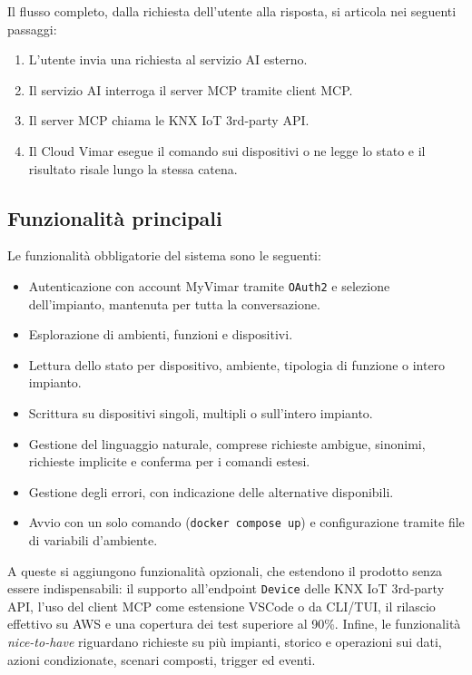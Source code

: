 \documentclass[11pt, a4paper]{article}
\begin{document}
\noindent Il flusso completo, dalla richiesta dell'utente alla risposta, si articola nei seguenti passaggi:
\begin{enumerate}
    \item L'utente invia una richiesta al servizio AI esterno.
    \item Il servizio AI interroga il server MCP tramite client MCP.
    \item Il server MCP chiama le KNX IoT 3rd-party API.
    \item Il Cloud Vimar esegue il comando sui dispositivi o ne legge lo stato e il risultato risale lungo la stessa catena.
\end{enumerate}

\subsection{Funzionalità principali}
Le funzionalità obbligatorie del sistema sono le seguenti:
\begin{itemize}
    \item Autenticazione con account MyVimar tramite \texttt{OAuth2} e selezione dell'impianto, mantenuta per tutta la conversazione.
    \item Esplorazione di ambienti, funzioni e dispositivi.
    \item Lettura dello stato per dispositivo, ambiente, tipologia di funzione o intero impianto.
    \item Scrittura su dispositivi singoli, multipli o sull'intero impianto.
    \item Gestione del linguaggio naturale, comprese richieste ambigue, sinonimi, richieste implicite e conferma per i comandi estesi.
    \item Gestione degli errori, con indicazione delle alternative disponibili.
    \item Avvio con un solo comando (\texttt{docker compose up}) e configurazione tramite file di variabili d'ambiente.
\end{itemize}

\noindent A queste si aggiungono funzionalità opzionali, che estendono il prodotto senza essere indispensabili: il supporto all'endpoint \texttt{Device} delle KNX IoT 3rd-party API, l'uso del client MCP come estensione VSCode o da CLI/TUI, il rilascio effettivo su AWS e una copertura dei test superiore al 90\%. Infine, le funzionalità \emph{nice-to-have} riguardano richieste su più impianti, storico e operazioni sui dati, azioni condizionate, scenari composti, trigger ed eventi.
\end{document}
